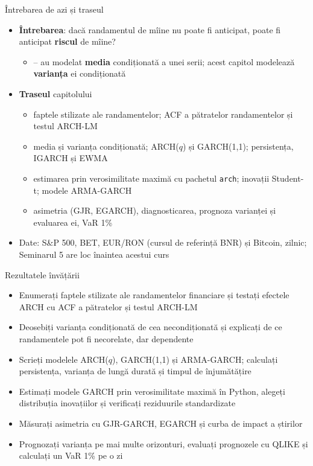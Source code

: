 \begin{frame}{Întrebarea de azi și traseul}
\itemsize{\small}
\begin{itemize}
    \item \textbf{Întrebarea}: dacă randamentul de mîine nu poate fi anticipat, poate fi anticipat \textbf{riscul} de mîine?
    \begin{itemize}
        \item {}-- au modelat \textbf{media} condiționată a unei serii; acest capitol modelează \textbf{varianța} ei condiționată
    \end{itemize}
    \item \textbf{Traseul} capitolului
    \begin{itemize}
        \item faptele stilizate ale randamentelor; ACF a pătratelor randamentelor și testul ARCH-LM
        \item media și varianța condiționată; ARCH($q$) și GARCH(1,1); persistența, IGARCH și EWMA
        \item estimarea prin verosimilitate maximă cu pachetul \texttt{arch}; inovații Student-t; modele ARMA-GARCH
        \item asimetria (GJR, EGARCH), diagnosticarea, prognoza varianței și evaluarea ei, VaR 1\%
    \end{itemize}
    \item Date: S\&P 500, BET, EUR/RON (cursul de referință BNR) și Bitcoin, zilnic; Seminarul 5 are loc înaintea acestui curs
\end{itemize}
\end{frame}

\begin{frame}{Rezultatele învățării}
\itemsize{\small}
\begin{itemize}
    \item Enumerați faptele stilizate ale randamentelor financiare și testați efectele ARCH cu ACF a pătratelor și testul ARCH-LM
    \item Deosebiți varianța condiționată de cea necondiționată și explicați de ce randamentele pot fi necorelate, dar dependente
    \item Scrieți modelele ARCH($q$), GARCH(1,1) și ARMA-GARCH; calculați persistența, varianța de lungă durată și timpul de înjumătățire
    \item Estimați modele GARCH prin verosimilitate maximă în Python, alegeți distribuția inovațiilor și verificați reziduurile standardizate
    \item Măsurați asimetria cu GJR-GARCH, EGARCH și curba de impact a știrilor
    \item Prognozați varianța pe mai multe orizonturi, evaluați prognozele cu QLIKE și calculați un VaR 1\% pe o zi
\end{itemize}
\end{frame}

